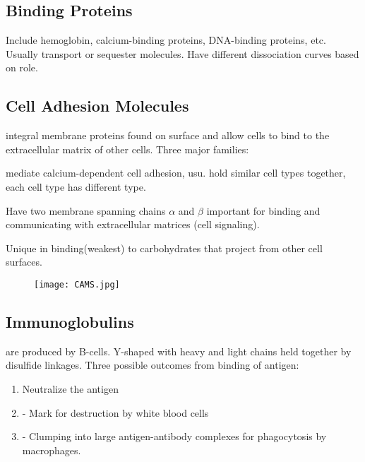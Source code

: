 \documentclass[../Bio_chemistryReview.tex]{subfiles}
\begin{document}
\subsection{Binding Proteins\supdag} 

Include hemoglobin, calcium-binding proteins, DNA-binding proteins, etc. Usually
transport or sequester molecules. Have different dissociation curves based on
role.

\subsection{Cell Adhesion Molecules\supdag}

 integral membrane proteins found on surface and allow cells to bind to the extracellular matrix of other cells. Three major families:
\begin{description}
  \item {} mediate calcium-dependent cell adhesion, usu. hold
    similar cell types together, each cell type has different type.
  \item {} Have two membrane spanning chains $ \alpha $ and $
    \beta $ important for binding and communicating with extracellular matrices
    (cell signaling).
  \item {} Unique in binding(weakest) to carbohydrates that
    project from other cell surfaces.  
\end{description}

\begin{figure}[h]
  \centering
  \texttt{[image: CAMS.jpg]}
\end{figure}

\subsection{Immunoglobulins\supdag}

 are produced by B-cells. Y-shaped with heavy and light chains
held together by disulfide linkages. Three possible outcomes from binding of
antigen:
\begin{enumerate}
  \item Neutralize the antigen
  \item {} - Mark for destruction by white blood cells
  \item {} - Clumping into large antigen-antibody complexes
    for phagocytosis by macrophages.  
\end{enumerate}
\end{document}
